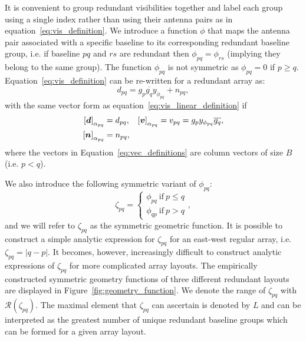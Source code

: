\documentclass[useAMS,usenatbib]{mn2e}
\newcommand{\bd}{\bmath{d}}
\newcommand{\bv}{\bmath{v}}
\newcommand{\bn}{\bmath{n}}
\newcommand{\conj}[1]{\overline{#1}}
\begin{document}
It is convenient to group redundant visibilities together and label each group using a single index rather than using their antenna pairs as in equation~\ref{eq:vis_definition}. We introduce a function $\phi$ that maps the antenna pair associated with a specific baseline to its corresponding redundant baseline group, i.e. if baseline $pq$ and $rs$ are redundant then $\phi_{pq} = \phi_{rs}$ (implying they belong to the same group). The function $\phi_{pq}$ is not symmetric as $\phi_{pq} = 0$ if $p \geq q$. Equation~\ref{eq:vis_definition} can be re-written for a redundant array as:
\begin{equation}
\label{eq:vis_red}
d_{pq} = g_{p}\conj{g_q}y_{\phi_{pq}} + n_{pq},
\end{equation}
with the same vector form as equation~\ref{eq:vis_linear_definition} if
\begin{align}
 \left [ \bd \right]_{\alpha_{pq}} &= d_{pq}, & \left [ \bv \right ]_{\alpha_{pq}} &= v_{pq}=g_p y_{\phi_{pq}} \conj{g_q},\nonumber\\
 \left [ \bn \right ]_{\alpha_{pq}} &= n_{pq}, &  &\label{eq:vec_definitions}
\end{align}
where the vectors in Equation~\ref{eq:vec_definitions} are column vectors of size $B$ (i.e. $p<q$).

We also introduce the following symmetric variant of $\phi_{pq}$:
\begin{equation}
\zeta_{pq} = 
\begin{cases}
\phi_{pq}~\textrm{if}~p \leq q\\
\phi_{qp}~\textrm{if}~p>q
\end{cases},
\end{equation} 
and we will refer to $\zeta_{pq}$ as the symmetric geometric function.
It is possible to construct a simple analytic expression for $\zeta_{pq}$ for an east-west regular array, i.e. $\zeta_{pq} = |q-p|$. It becomes, however, increasingly difficult to construct analytic expressions of $\zeta_{pq}$ for more complicated array layouts. The empirically constructed symmetric geometry functions of three different redundant layouts are displayed in Figure~\ref{fig:geometry_function}. We denote the range of $\zeta_{pq}$ with $\mathcal{R}(\zeta_{pq})$. The maximal element that $\zeta_{pq}$ can ascertain is denoted by $L$ and can be interpreted as the greatest number of unique redundant baseline groups which can be formed for a given array layout. 
\end{document}
